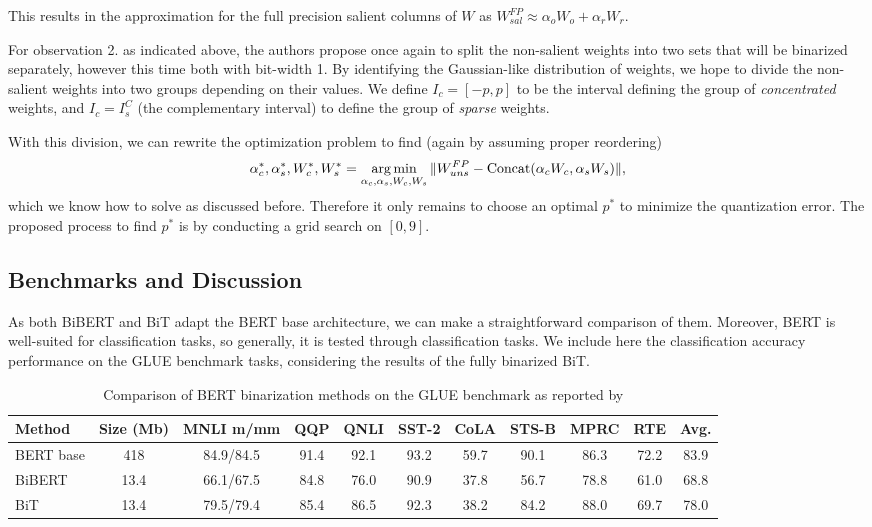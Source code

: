 This results in the approximation for the full precision salient columns of $W$ as $W_{sal}^{FP} \approx \alpha_o W_o + \alpha_r W_r$. 

\vspace{0.5em}

For observation 2. as indicated above, the authors propose once again to split the non-salient weights into two sets that will be binarized separately, however this time both with bit-width 1. By identifying the Gaussian-like distribution of weights, we hope to divide the non-salient weights into two groups depending on their values. We define $I_c = [-p, p]$ to be the interval defining the group of \textit{concentrated} weights, and $I_c = I_s^{C}$ (the complementary interval) to define the group of \textit{sparse} weights. 

With this division, we can rewrite the optimization problem to find (again by assuming proper reordering)
\begin{equation}
   \alpha_c^*, \alpha_s^*, W_c^*, W_s^* =   \operatorname*{arg\,min}_{ \alpha_c, \alpha_s, W_c, W_s} \| W_{uns}^{FP}- \text{Concat}(\alpha_cW_c, \alpha_sW_s) \|,
\end{equation}
which we know how to solve as discussed before. Therefore it only remains to choose an optimal $p^*$ to minimize the quantization error. The proposed process to find $p^*$ is by conducting a grid search on $[0, 9]$. 

\subsection{Benchmarks and Discussion}

As both BiBERT and BiT adapt the BERT base architecture, we can make a straightforward comparison of them. Moreover, BERT is well-suited for classification tasks, so generally, it is tested through classification tasks. We include here the classification accuracy performance on the GLUE \cite{wang2019glue} benchmark tasks, considering the results of the fully binarized BiT.

\begin{table}[ht!]
\small
\centering
\begin{tabular}{l c c c c c c c c c c} 
\hline
  Method & Size (Mb) & MNLI m/mm & QQP & QNLI & SST-2 & CoLA & STS-B & MPRC & RTE & Avg. \\
\hline
    BERT base & 418 & 84.9/84.5 & 91.4 & 92.1 & 93.2 & 59.7 & 90.1 &  86.3 & 72.2 & 83.9\\
    BiBERT & 13.4 &  66.1/67.5 & 84.8 & 76.0 & 90.9 & 37.8 & 56.7 & 78.8 & 61.0 & 68.8 \\
    BiT & 13.4 & 79.5/79.4 & 85.4 & 86.5 & 92.3 & 38.2 & 84.2 & 88.0 & 69.7 & 78.0  \\
\hline
\end{tabular}
\caption{Comparison of BERT binarization methods on the GLUE benchmark as reported by \cite{liu2022bit}}
\label{table:bert}
\end{table}

